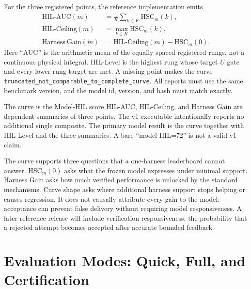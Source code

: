 \documentclass[11pt]{article}
\theoremstyle{definition}
\newcommand{\HSC}{\ensuremath{\mathrm{HSC}}}
\begin{document}
For the three registered points, the reference implementation emits
\begin{align}
\mathrm{HIL\mbox{-}AUC}(m) &= \frac{1}{K}\sum_{k\in K}\HSC_m(k),\\
\mathrm{HIL\mbox{-}Ceiling}(m) &= \max_{k\in K}\HSC_m(k),\\
\mathrm{Harness\ Gain}(m) &= \mathrm{HIL\mbox{-}Ceiling}(m)-\HSC_m(0).
\end{align}
Here ``AUC'' is the arithmetic mean of the equally spaced registered rungs, not a continuous physical integral. HIL-Level is the highest rung whose target $U$ gate and every lower rung target are met. A missing point makes the curve \texttt{truncated\_not\_comparable\_to\_complete\_curve}. All reports must use the same benchmark version, and the model id, version, and hash must match exactly.

\begin{cautionbox}{The curve is the Model-HIL score}
HIL-AUC, HIL-Ceiling, and Harness Gain are dependent summaries of three points. The v1 executable intentionally reports no additional single composite. The primary model result is the curve together with HIL-Level and the three summaries. A bare ``model HIL=72'' is not a valid v1 claim.
\end{cautionbox}

The curve supports three questions that a one-harness leaderboard cannot answer. $\HSC_m(0)$ asks what the frozen model expresses under minimal support. Harness Gain asks how much verified performance is unlocked by the standard mechanisms. Curve shape asks where additional harness support stops helping or causes regression. It does not causally attribute every gain to the model: acceptance can prevent false delivery without requiring model responsiveness. A later reference release will include verification responsiveness, the probability that a rejected attempt becomes accepted after accurate bounded feedback.

\section{Evaluation Modes: Quick, Full, and Certification}\label{sec:modes}
\end{document}

